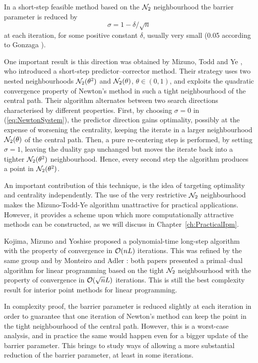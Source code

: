 In a short-step feasible method based on the $\mathcal{N}_2$ neighbourhood
the barrier parameter is reduced by 
\[
   \sigma = 1 - \delta/\sqrt{n}
\]
at each iteration, for some positive constant $\delta$, usually
very small (0.05 according to Gonzaga \cite{Gonzaga91a}).

One important result is this direction was obtained by 
Mizuno, Todd and Ye \cite{MizunoToddYe}, who introduced a short-step 
predictor--corrector method. Their strategy uses two nested neighbourhoods 
$\mathcal{N}_2(\theta^2)$ and $\mathcal{N}_2(\theta)$, $\theta \in (0,1)$, 
and exploits the
quadratic convergence property of Newton's method in such a tight
neighbourhood of the central path.
Their algorithm alternates between two search directions characterised by
different properties.
First, by choosing $\sigma = 0$ in (\ref{eq:NewtonSystem}),
the predictor direction gains optimality, possibly at the expense of
worsening the centrality, keeping the iterate in a larger neighbourhood
$\mathcal{N}_2(\theta)$ of the central path. 
Then, a pure re-centering step is performed, by setting $\sigma = 1$,
leaving the duality gap unchanged but moves the iterate back into a 
tighter $\mathcal{N}_2(\theta^2)$ neighbourhood. Hence, every second step the 
algorithm produces a point in $\mathcal{N}_2(\theta^2)$.

An important contribution of this technique, is the idea 
of targeting optimality and centrality independently. 
The use of the very restrictive $\mathcal{N}_2$ neighbourhood 
makes the Mizuno-Todd-Ye algorithm unattractive for practical applications.
However, it provides a scheme 
upon which more computationally attractive methods can be constructed,
as we will discuss in Chapter~\ref{ch:PracticalIpm}.

\hrulefill

Kojima, Mizuno and Yoshise \cite{KojimaMizunoYoshise89} 
proposed a polynomial-time long-step algorithm with the property of convergence
in $\mathcal{O}(nL)$ iterations.
This was refined by the same group \cite{KojimaMizunoYoshise89b} 
and by Monteiro and Adler \cite{MonteiroAdler89a}:
both papers presented a primal--dual algorithm for linear programming 
based on the tight $\mathcal{N}_2$ neighbourhood
with the property of convergence in $\mathcal{O}(\sqrt{n}L)$ iterations.
This is still the best complexity result for interior point methods
for linear programming.

In complexity proof, the barrier parameter is reduced slightly at
each iteration in order to guarantee that one iteration of Newton's
method can keep the point in the tight neighbourhood of the central path.
However, this is a worst-case analysis, and in practice the same would happen
even for a bigger update of the barrier parameter. This brings to
study ways of allowing a more substantial reduction of the barrier
parameter, at least in some iterations. 

